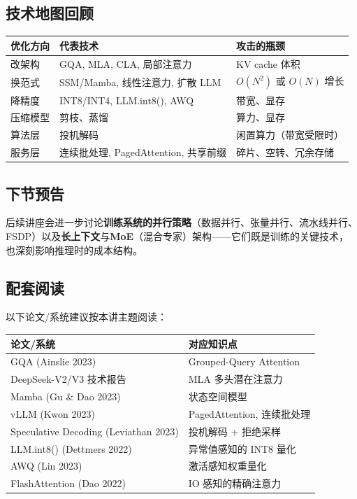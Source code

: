 \documentclass[a4paper]{article}
\begin{document}
\subsection{技术地图回顾}

\begin{tabular}{p{4cm}p{4cm}p{6cm}}
\toprule
\textbf{优化方向} & \textbf{代表技术} & \textbf{攻击的瓶颈} \\
\midrule
改架构 & GQA, MLA, CLA, 局部注意力 & KV cache 体积 \\
换范式 & SSM/Mamba, 线性注意力, 扩散 LLM & $O(N^2)$ 或 $O(N)$ 增长 \\
降精度 & INT8/INT4, LLM.int8(), AWQ & 带宽、显存 \\
压缩模型 & 剪枝、蒸馏 & 算力、显存 \\
算法层 & 投机解码 & 闲置算力（带宽受限时） \\
服务层 & 连续批处理, PagedAttention, 共享前缀 & 碎片、空转、冗余存储 \\
\bottomrule
\end{tabular}

\subsection{下节预告}

后续讲座会进一步讨论\textbf{训练系统的并行策略}（数据并行、张量并行、流水线并行、FSDP）以及\textbf{长上下文}与\textbf{MoE}（混合专家）架构——它们既是训练的关键技术，也深刻影响推理时的成本结构。

\subsection{配套阅读}

以下论文/系统建议按本讲主题阅读：

\begin{tabular}{p{7cm}p{6cm}}
\toprule
\textbf{论文/系统} & \textbf{对应知识点} \\
\midrule
GQA (Ainslie 2023) & Grouped-Query Attention \\
DeepSeek-V2/V3 技术报告 & MLA 多头潜在注意力 \\
Mamba (Gu \& Dao 2023) & 状态空间模型 \\
vLLM (Kwon 2023) & PagedAttention, 连续批处理 \\
Speculative Decoding (Leviathan 2023) & 投机解码 + 拒绝采样 \\
LLM.int8() (Dettmers 2022) & 异常值感知的 INT8 量化 \\
AWQ (Lin 2023) & 激活感知权重量化 \\
FlashAttention (Dao 2022) & IO 感知的精确注意力 \\
\bottomrule
\end{tabular}

\end{document}
